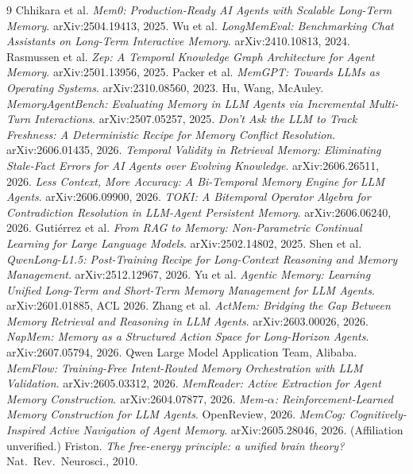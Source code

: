 \documentclass[11pt]{article}
\begin{document}
\begin{thebibliography}{9}\small
{} Chhikara et al. \emph{Mem0: Production-Ready AI Agents with Scalable Long-Term Memory}. arXiv:2504.19413, 2025.
 Wu et al. \emph{LongMemEval: Benchmarking Chat Assistants on Long-Term Interactive Memory}. arXiv:2410.10813, 2024.
 Rasmussen et al. \emph{Zep: A Temporal Knowledge Graph Architecture for Agent Memory}. arXiv:2501.13956, 2025.
 Packer et al. \emph{MemGPT: Towards LLMs as Operating Systems}. arXiv:2310.08560, 2023.
 Hu, Wang, McAuley. \emph{MemoryAgentBench: Evaluating Memory in LLM Agents via Incremental Multi-Turn Interactions}. arXiv:2507.05257, 2025.
 \emph{Don't Ask the LLM to Track Freshness: A Deterministic Recipe for Memory Conflict Resolution}. arXiv:2606.01435, 2026.
 \emph{Temporal Validity in Retrieval Memory: Eliminating Stale-Fact Errors for AI Agents over Evolving Knowledge}. arXiv:2606.26511, 2026.
 \emph{Less Context, More Accuracy: A Bi-Temporal Memory Engine for LLM Agents}. arXiv:2606.09900, 2026.
 \emph{TOKI: A Bitemporal Operator Algebra for Contradiction Resolution in LLM-Agent Persistent Memory}. arXiv:2606.06240, 2026.
 Guti\'errez et al. \emph{From RAG to Memory: Non-Parametric Continual Learning for Large Language Models}. arXiv:2502.14802, 2025.
 Shen et al. \emph{QwenLong-L1.5: Post-Training Recipe for Long-Context Reasoning and Memory Management}. arXiv:2512.12967, 2026.
 Yu et al. \emph{Agentic Memory: Learning Unified Long-Term and Short-Term Memory Management for LLM Agents}. arXiv:2601.01885, ACL 2026.
 Zhang et al. \emph{ActMem: Bridging the Gap Between Memory Retrieval and Reasoning in LLM Agents}. arXiv:2603.00026, 2026.
 \emph{NapMem: Memory as a Structured Action Space for Long-Horizon Agents}. arXiv:2607.05794, 2026. Qwen Large Model Application Team, Alibaba.
 \emph{MemFlow: Training-Free Intent-Routed Memory Orchestration with LLM Validation}. arXiv:2605.03312, 2026.
 \emph{MemReader: Active Extraction for Agent Memory Construction}. arXiv:2604.07877, 2026.
 \emph{Mem-$\alpha$: Reinforcement-Learned Memory Construction for LLM Agents}. OpenReview, 2026.
 \emph{MemCog: Cognitively-Inspired Active Navigation of Agent Memory}. arXiv:2605.28046, 2026. (Affiliation unverified.)
 Friston. \emph{The free-energy principle: a unified brain theory?} Nat.\ Rev.\ Neurosci., 2010.
\end{thebibliography}
\end{document}
